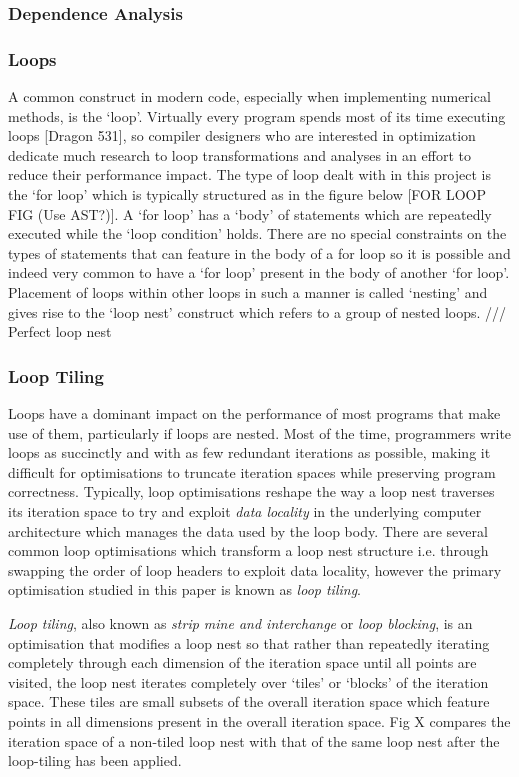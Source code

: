 \documentclass[a4paper,12pt,twoside]{report}
\begin{document}
\subsubsection{Dependence Analysis}

\subsubsection{Loops}
A common construct in modern code, especially when implementing numerical methods, is the `loop'. Virtually every program spends most of its 
time executing loops [Dragon 531], so compiler designers who are interested in optimization dedicate much research to 
loop transformations and analyses in an effort to reduce their performance impact. The type of loop dealt with in this project is the
`for loop' which is typically structured as in the figure below [FOR LOOP FIG (Use AST?)]. A `for loop' has a `body' of statements which are repeatedly executed
while the `loop condition' holds. There are no special constraints on the types of statements that can feature in the body of a for loop so it
is possible and indeed very common to have a `for loop' present in the body of another `for loop'. Placement of loops within other loops in such a manner
	is called `nesting' and gives rise to the `loop nest' construct which refers to a group of nested loops. /// Perfect loop nest

\subsubsection{Loop Tiling}
Loops have a dominant impact on the performance of most programs that make use of them, particularly if loops are nested.
Most of the time, programmers write loops as succinctly and with as few redundant iterations as possible, making it difficult
for optimisations to truncate iteration spaces while preserving program correctness. Typically, loop optimisations reshape the
way a loop nest traverses its iteration space to try and exploit \textit{data locality} in the underlying computer architecture which
manages the data used by the loop body. There are several common loop optimisations which transform a loop nest structure i.e. through
swapping the order of loop headers to exploit data locality, however the primary optimisation studied in this paper is known as
\textit{loop tiling}.

\textit{Loop tiling}, also known as \textit{strip mine and interchange} or \textit{loop blocking}, is an optimisation that modifies 
a loop nest so that rather than repeatedly iterating completely through each dimension of the iteration space until all points are
visited, the loop nest iterates completely over `tiles' or `blocks' of the iteration space. These tiles are small subsets of the overall
iteration space which feature points in all dimensions present in the overall iteration space. Fig X compares the iteration space of a non-tiled
loop nest with that of the same loop nest after the loop-tiling has been applied.
\end{document}
